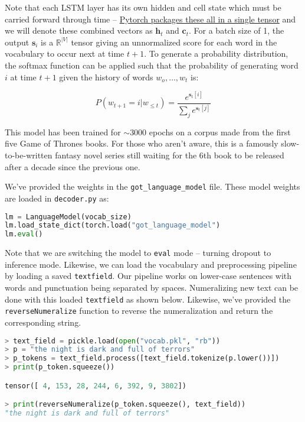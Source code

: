 \documentclass[a4paper,10pt]{article}
\begin{document}
\noindent Note that each LSTM layer has its own hidden and cell state which must be carried forward through time -- \hyperlink{https://pytorch.org/docs/stable/generated/torch.nn.LSTM.html}{Pytorch packages these all in a single tensor} and we will denote these combined vectors as $\textbf{h}_t$ and $\textbf{c}_t$. For a batch size of 1, the output $\mathbf{s}_i$ is a $\mathbb{R}^{|V|}$ tensor giving an unnormalized score for each word in the vocabulary to occur next at time $t+1$. To generate a probability distribution, the softmax function can be applied such that the probability of generating word $i$ at time $t+1$ given the history of words $w_o, \dots, w_{t}$ is:

\begin{equation}
    P(w_{t+1} = i | w_{\leq t}) = \frac{e^{\mathbf{s}_t[i]}}{\sum_j e^{\mathbf{s}_t[j]}}
\end{equation}

\noindent This model has been trained for $\sim$3000 epochs on a corpus made from the first five Game of Thrones books. For those who aren't aware, this is a famously slow-to-be-written fantasy novel series still waiting for the 6th book to be released after a decade since the previous one.

We've provided the weights in the \texttt{got\_language\_model} file. These model weights are loaded in \texttt{decoder.py} as:
%
\begin{center}
\begin{minipage}{0.9\textwidth}
\begin{lstlisting}[language=Python]
lm = LanguageModel(vocab_size)
lm.load_state_dict(torch.load("got_language_model")
lm.eval()
\end{lstlisting}
\end{minipage}
\end{center}
%
Note that we are switching the model to \texttt{eval} mode -- turning dropout to inference mode. Likewise, we can load the vocabulary and preprocessing pipeline by loading a saved \texttt{textfield}. Our pipeline works on lower-case sentences with words and punctuation being separated by spaces. Numeralizing new text can be done with this loaded \texttt{textfield} as shown below. Likewise, we've provided the \texttt{reverseNumeralize} function to reverse the numeralization and return the corresponding string. 
%
\begin{center}
\begin{minipage}{0.9\textwidth}
\begin{lstlisting}[language=Python]
> text_field = pickle.load(open("vocab.pkl", "rb"))
> p = "the night is dark and full of terrors"
> p_tokens = text_field.process([text_field.tokenize(p.lower())])
> print(p_token.squeeze())

tensor([ 4, 153, 28, 244, 6, 392, 9, 3802])

> print(reverseNumeralize(p_token.squeeze(), text_field))
"the night is dark and full of terrors"
\end{lstlisting}
\end{minipage}
\end{center}
%
\end{document}
